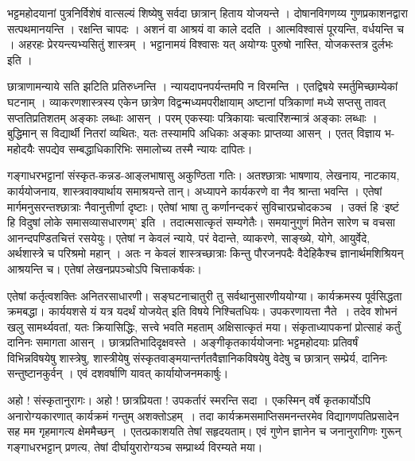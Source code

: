 {भट्टमहोदयानां पुत्रनिर्विशेषं वात्सल्यं शिष्येषु सर्वदा छात्रान् हिताय योजयन्ते । दोषानविगणय्य गुणप्रकाशनद्वारा सत्पथमानयन्ति । रक्षन्ति चापदः । अशनं वा आश्रयं वा काले ददति । आत्मविश्वासं पूरयन्ति, वर्धयन्ति च । अहरहः प्रेरयन्त्यभ्यसितुं शास्त्रम् । भट्टानामयं विश्वासः यत् अयोग्यः पुरुषो नास्ति, योजकस्तत्र दुर्लभः इति ।
 
छात्राणामन्याये सति झटिति प्रतिरुध्नन्ति । न्यायदापनपर्यन्तमपि न विरमन्ति । एतद्विषये स्मर्तुमिच्छाम्येकां घटनाम् । व्याकरणशास्त्रस्य एकेन छात्रेण विद्वन्मध्यमपरीक्षायाम् अष्टानां पत्रिकाणां मध्ये सप्तसु तावत् सप्ततिप्रतिशतम् अङ्काः लब्धाः आसन् । परम् एकस्याः पत्रिकायाः चत्वारिंशन्मात्रं अङ्काः लब्धाः । बुद्धिमान् स विद्यार्थी नितरां व्यथितः, यतः तस्यामपि अधिकाः अङ्काः प्राप्तव्या आसन् । एतत् विज्ञाय भ-महोदयैः सपद्येव सम्बद्धाधिकारिभिः समालोच्य तस्मै न्यायः दापितः।

गङ्गाधरभट्टानां संस्कृत-कन्नड-आङ्लभाषासु अकुण्ठिता गतिः। अतश्छात्राः भाषणाय, लेखनाय, नाटकाय, कार्ययोजनाय, शास्त्रवाक्यार्थाय समाश्रयन्ते तान्। अध्यापने कार्यकरणे वा नैव श्रान्ता भवन्ति । एतेषां मार्गमनुसरन्तश्छात्राः नैवानुत्तीर्णा दृष्टाः। एतेषां भाषा तु कर्णानन्दकरं सुविचारप्रचोदकञ्च~। उक्तं हि ‘इष्टं हि विदुषां लोके समासव्यासधारणम्’ इति । तदात्मसात्कृतं सम्यगेतैः। समयानुगुणं मितेन सारेण च वचसा आनन्दपण्डितचित्तं रसयेयुः। एतेषां न केवलं न्याये, परं वेदान्ते, व्याकरणे, साङ्ख्ये, योगे, आयुर्वेदे, अर्थशास्त्रे च परिश्रमो महान् । अतः न केवलं शास्त्रच्छात्राः किन्तु पौरजनपदैः वैदेहिकैश्च ज्ञानार्थमशिश्रियन् आश्रयन्ति च। एतेषां लेखनप्रपञ्चोऽपि चित्ताकर्षकः। 

एतेषां कर्तृत्वशक्तिः अनितरसाधारणी। सङ्घटनाचातुरी तु सर्वथानुसारणीययोग्या। कार्यक्रमस्य पूर्वसिद्धता क्रमबद्धा। कार्ययशसे यं यत्र यदर्थं योजयेत् इति विषये निश्चितधियः। उपकरणायत्ता नैते~। तदेव शोभनं खलु सामर्थ्यवतां, यतः क्रियासिद्धिः, सत्त्वे भवति महताम् अक्षिसात्कृतं मया। संकृताध्यापकनां प्रोत्साहं कर्तुं दानिनः समागता आसन् । छात्रप्रतिभादिदृक्षवस्ते । अङ्गीकृतकार्ययोजनाः भट्टमहोदयाः प्रतिवर्षं विभिन्नविषयेषु शास्त्रेषु, शास्त्रीयेषु  संस्कृतवाङ्मयान्तर्गत\enginline{-}वैज्ञानिकविषयेषु वेदेषु च छात्रान् सम्प्रेर्य, दानिनः सन्तुष्टानकुर्वन् । एवं दशवर्षाणि यावत् कार्यायोजनमकार्षुः। 

अहो ! संस्कृतानुरागः। अहो ! छात्रप्रियता ! उपकर्तारं स्मरन्ति सदा । एकस्मिन् वर्षे कृतकार्योऽपि अनारोग्यकारणात् कार्यक्रमं गन्तुम् अशक्तोऽहम्~। तदा कार्यक्रम\-समाप्तिसमनन्तरमेव विद्यागणपतिप्रसादेन सह मम गृहमागत्य क्षेममैच्छन्~। एतत्प्रकाशयति तेषां सहृदयताम्। एवं गुणेन ज्ञानेन च जनानुरागिणः गुरून् गङ्गाधरभट्टान् प्रणत्य, तेषां दीर्घायुरारोग्यञ्च सम्प्रार्थ्य विरम्यते मया।  


\articleend
}
